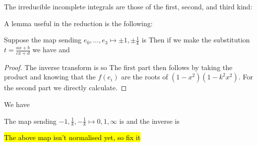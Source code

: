 \documentclass{article}
\begin{document}
\begin{idea}
	The irreducible incomplete integrals are those of the first, second, and third kind:
\end{idea}

A lemma useful in the reduction is the following:
\begin{prop}
	Suppose the map sending $e_0, \dots, e_3 \mapsto \pm 1, \pm \frac{1}{k}$ is 
Then if we make the substitution $t = \frac{ax+b}{cx+d}$ we have 
and 
\end{prop}
\begin{proof}
The inverse transform is 
so 
The first part then follows by taking the product and knowing that the $f(e_i)$ are the roots of $(1-x^2)(1-k^2x^2)$. For the second part we directly calculate. 
\end{proof}

\begin{corollary}
	We have
\end{corollary}

\begin{lemma}
	The map sending $-1,\frac{1}{k},-\frac{1}{k} \mapsto 0,1,\infty$ is 
and the inverse is 
\end{lemma}
\begin{remark}
	\hl{The above map isn't normalised yet, so fix it}
\end{remark}
\end{document}
